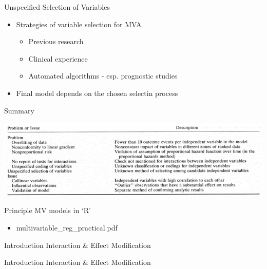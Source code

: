 \documentclass[ignorenonframetext,]{beamer}
\begin{document}
\begin{frame}{Unspecified Selection of Variables}

\begin{itemize}
\itemsep1pt\parskip0pt
\item
  Strategies of variable selection for MVA

  \begin{itemize}
  \itemsep1pt\parskip0pt
  \item
    Previous research
  \item
    Clinical experience
  \item
    Automated algorithms - esp. prognostic studies
  \end{itemize}
\item
  Final model depends on the chosen selectin process
\end{itemize}

\end{frame}

\begin{frame}{Summary}

\includegraphics{summary.png}

\end{frame}

\begin{frame}{Principle MV models in `R'}

\begin{itemize}
\itemsep1pt\parskip0pt
\item
  multivariable\_reg\_practical.pdf
\end{itemize}

\end{frame}

\begin{frame}{Introduction Interaction \& Effect Modification}

Introduction Interaction \& Effect Modification

\end{frame}
\end{document}
